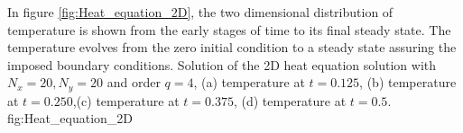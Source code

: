 In figure \ref{fig:Heat_equation_2D}, the two dimensional distribution of temperature is shown from the early stages of time to its final steady state. The temperature evolves from the zero initial condition to a steady state assuring the imposed boundary conditions. 
\fourgraphs
{}
{}
{}
{}
{Solution of the 2D heat equation solution with  $N_x=20, N_y =20$  and order $q=4$, (a) temperature at $ t=0.125$, (b) temperature at $ t=0.250$,(c) temperature at $ t=0.375$, (d) temperature at $ t=0.5$. }{fig:Heat_equation_2D}
                  
        

      
      
    
\newpage       
